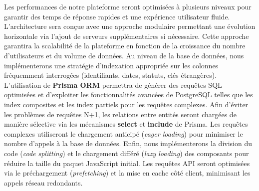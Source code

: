 \begin{itemize}[label=$\blacktriangleright$]
Les performances de notre plateforme seront optimisées à plusieurs niveaux pour garantir des temps de réponse rapides et une expérience utilisateur fluide.
\newline
L'architecture sera conçue avec une approche modulaire permettant une évolution horizontale via l'ajout de serveurs supplémentaires si nécessaire. Cette approche garantira la scalabilité de la plateforme en fonction de la croissance du nombre d'utilisateurs et du volume de données.
\newline
Au niveau de la base de données, nous implémenterons une stratégie d'indexation appropriée sur les colonnes fréquemment interrogées (identifiants, dates, statuts, clés étrangères). L'utilisation de \textbf{Prisma ORM} permettra de générer des requêtes SQL optimisées et d'exploiter les fonctionnalités avancées de PostgreSQL telles que les index composites et les index partiels pour les requêtes complexes.
\newline
Afin d'éviter les problèmes de requêtes N+1, les relations entre entités seront chargées de manière sélective via les mécanismes \textbf{select} et \textbf{include} de Prisma. Les requêtes complexes utiliseront le chargement anticipé (\textit{eager loading}) pour minimiser le nombre d'appels à la base de données.
\newline
Enfin, nous implémenterons la division du code (\textit{code splitting}) et le chargement différé (\textit{lazy loading}) des composants pour réduire la taille du paquet JavaScript initial. Les requêtes API seront optimisées via le préchargement (\textit{prefetching}) et la mise en cache côté client, minimisant les appels réseau redondants.


\end{itemize}
